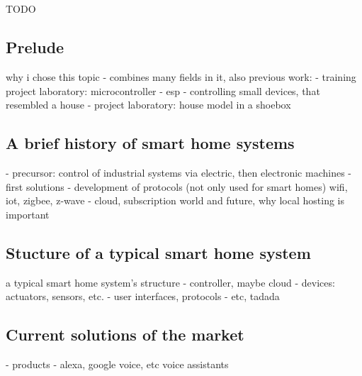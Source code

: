\chapter{\bevezetes}



TODO
\section{Prelude}
why i chose this topic
- combines many fields in it, also previous work:
- training project laboratory: microcontroller - esp - controlling small devices, that resembled a house
- project laboratory: house model in a shoebox
\section{A brief history of smart home systems}
- precursor: control of industrial systems via electric, then electronic machines
- first solutions
- development of protocols (not only used for smart homes) wifi, iot, zigbee, z-wave
- cloud, subscription world and future, why local hosting is important
\section{Stucture of a typical smart home system}
a typical smart home system's structure
- controller, maybe cloud
- devices: actuators, sensors, etc.
- user interfaces, protocols
- etc, tadada
\section{Current solutions of the market}
- products
- alexa, google voice, etc voice assistants
